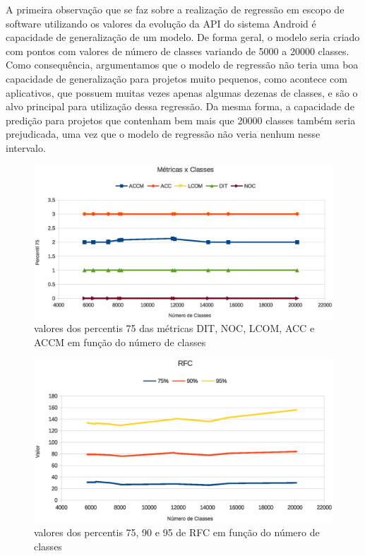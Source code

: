 A primeira observação que se faz sobre a realização de regressão em escopo de software utilizando os valores da evolução da API do sistema Android é capacidade de generalização de um modelo. De forma geral, o modelo seria criado com pontos com valores de número de classes variando de 5000 a 20000 classes. Como consequência, argumentamos que o modelo de regressão não teria uma boa capacidade de generalização para projetos muito pequenos, como acontece com aplicativos, que possuem muitas vezes apenas algumas dezenas de classes, e são o alvo principal para utilização dessa regressão. Da mesma forma, a capacidade de predição para projetos que contenham bem mais que 20000 classes também seria prejudicada, uma vez que o modelo de regressão não veria nenhum nesse intervalo. 

\begin{figure}[!htb]
\centering
\includegraphics [keepaspectratio=true,scale=0.7]{figuras/metricasxclasses.eps}
\caption{valores dos percentis 75 das métricas DIT, NOC, LCOM, ACC e ACCM em função do número de classes}
\label{fig:metricasxclasses}
\end{figure}

\begin{figure}[!htb]
\centering
\includegraphics [keepaspectratio=true,scale=0.7]{figuras/rfcxclasses.eps}
\caption{valores dos percentis 75, 90 e 95 de RFC em função do número de classes}
\label{fig:rfcxclasses}
\end{figure}

